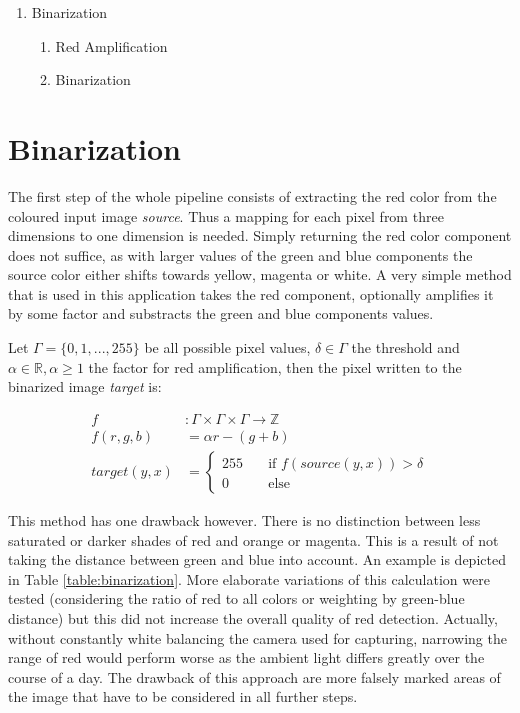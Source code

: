 \documentclass{report}
\begin{document}
\begin{enumerate}
\item Binarization

  \begin{enumerate}
  \item Red Amplification
  \item Binarization
  \end{enumerate}

\end{enumerate}


\pagebreak
\section{Binarization}

The first step of the whole pipeline consists of extracting the red
color from the coloured input image \textit{source}. Thus a mapping
for each pixel from three dimensions to one dimension is
needed. Simply returning the red color component does not suffice, as
with larger values of the green and blue components the source color
either shifts towards yellow, magenta or white. A very simple method
that is used in this application takes the red component, optionally
amplifies it by some factor and substracts the green and blue
components values.

Let \( \Gamma = \{0, 1, ..., 255\} \) be all possible pixel values, \(
\delta \in \Gamma \) the threshold and \( \alpha \in \mathbb{R},
\alpha \geq 1 \) the factor for red amplification, then the pixel
written to the binarized image \textit{target} is:

\begin{equation}\label{eq:binarization}
  \begin{split}
    f & : \Gamma \times \Gamma \times \Gamma \to \mathbb{Z} \\
    f(r, g, b) & = \alpha r - (g + b) \\
    target(y, x) & =
    \begin{cases}
      255 & \quad \text{if } f(source(y, x)) > \delta \\
      0   & \quad \text{else}
    \end{cases}
  \end{split}
\end{equation}

This method has one drawback however. There is no distinction between
less saturated or darker shades of red and orange or magenta. This is
a result of not taking the distance between green and blue into
account. An example is depicted in Table
\ref{table:binarization}. More elaborate variations of this
calculation were tested (considering the ratio of red to all colors or
weighting by green-blue distance) but this did not increase the
overall quality of red detection. Actually, without constantly white
balancing the camera used for capturing, narrowing the range of red
would perform worse as the ambient light differs greatly over the
course of a day. The drawback of this approach are more falsely marked
areas of the image that have to be considered in all further steps.
\end{document}
